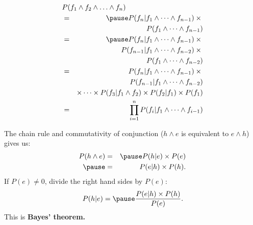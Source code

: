\documentclass[12pt]{beamer} %
\begin{document}
\begin{slide}
\begin{eqnarray*}
\lefteqn{P(f_{1}\wedge f_{2}\wedge \ldots \wedge f_{n})}\\
&=&\pause
P(f_{n}|f_{1}\wedge \cdots \wedge f_{n-1}) \times \mbox{}\\
&&P(f_{1}\wedge \cdots
\wedge f_{n-1})\\
&=&\pause
P(f_{n}|f_{1}\wedge \cdots \wedge f_{n-1}) \times \mbox{}\\
&&P(f_{n-1}|f_{1}\wedge \cdots \wedge f_{n-2}) \times \mbox{}\\
&&P(f_{1}\wedge \cdots \wedge f_{n-2})\\
&=&
P(f_{n}|f_{1}\wedge \cdots \wedge f_{n-1}) \times \mbox{}\\
&&P(f_{n-1}|f_{1}\wedge \cdots \wedge f_{n-2})\\
&&\times{}\cdots \times
P(f_{3}|f_1 \wedge f_2)\times{}
P(f_{2}|f_1)\times{}
P(f_{1})
\\
&=& \prod_{i=1}^n P(f_i|f_{1}\wedge \cdots \wedge f_{i-1})
\end{eqnarray*}
\end{slide}
\begin{slide}
The chain rule and commutativity of conjunction ($h\wedge e$ is
equivalent to $e\wedge h$) gives us:
\begin{eqnarray*}
P(h\wedge e) & = & \pause P(h|e) \times P(e)\\
\pause
&=& P(e|h)\times P(h).
\end{eqnarray*}
\pause
If $P(e)\neq 0$,  divide the right hand sides by $P(e)$:
\[{P(h | e ) =
\pause \frac{P(e | h ) \times  P(h )}{P(e )}}.\]
This is \textbf{Bayes' theorem.}

\end{slide}
\end{document}
